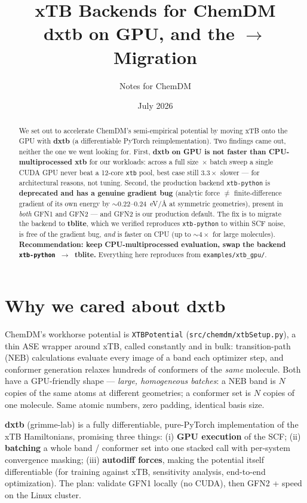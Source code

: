 \documentclass[11pt]{article}
\title{xTB Backends for ChemDM\\
       \large dxtb on GPU, and the \code{xtb-python} $\rightarrow$ \code{tblite} Migration}
\author{Notes for ChemDM}
\date{July 2026}
\newcommand{\code}[1]{\texttt{#1}}
\newcommand{\xtbpy}{\code{xtb-python}}
\begin{document}
\maketitle

\begin{abstract}
\noindent
We set out to accelerate ChemDM's semi-empirical potential by moving xTB onto the
GPU with \textbf{dxtb} (a differentiable PyTorch reimplementation). Two findings
came out, neither the one we went looking for. First, \textbf{dxtb on GPU is not
faster than CPU-multiprocessed xtb} for our workloads: across a full size~$\times$
batch sweep a single CUDA GPU never beat a 12-core \code{xtb} pool, best case
still $3.3\times$ slower --- for architectural reasons, not tuning. Second, the
production backend \xtbpy{} is \textbf{deprecated and has a genuine gradient bug}
(analytic force $\neq$ finite-difference gradient of its own energy by
$\sim\!0.22$--$0.24$~eV/\AA{} at symmetric geometries), present in \emph{both}
GFN1 and GFN2 --- and GFN2 is our production default. The fix is to migrate the
backend to \textbf{tblite}, which we verified reproduces \xtbpy{} to within SCF
noise, is free of the gradient bug, \emph{and} is faster on CPU
(up to $\sim\!4\times$ for large molecules). \textbf{Recommendation: keep
CPU-multiprocessed evaluation, swap the backend \xtbpy{}~$\rightarrow$~tblite.}
Everything here reproduces from \code{examples/xtb\_gpu/}.
\end{abstract}

\section{Why we cared about dxtb}

ChemDM's workhorse potential is \code{XTBPotential} (\code{src/chemdm/xtbSetup.py}),
a thin ASE wrapper around xTB, called constantly and in bulk: transition-path
(NEB) calculations evaluate every image of a band each optimizer step, and
conformer generation relaxes hundreds of conformers of the \emph{same} molecule.
Both have a GPU-friendly shape --- \emph{large, homogeneous batches}: a NEB band
is $N$ copies of the same atoms at different geometries; a conformer set is $N$
copies of one molecule. Same atomic numbers, zero padding, identical basis size.

\textbf{dxtb} (grimme-lab) is a fully differentiable, pure-PyTorch implementation
of the xTB Hamiltonians, promising three things: (i) \textbf{GPU execution} of the
SCF; (ii) \textbf{batching} a whole band / conformer set into one stacked call
with per-system convergence masking; (iii) \textbf{autodiff forces}, making the
potential itself differentiable (for training against xTB, sensitivity analysis,
end-to-end optimization). The plan: validate GFN1 locally (no CUDA), then GFN2 +
speed on the Linux cluster.
\end{document}
